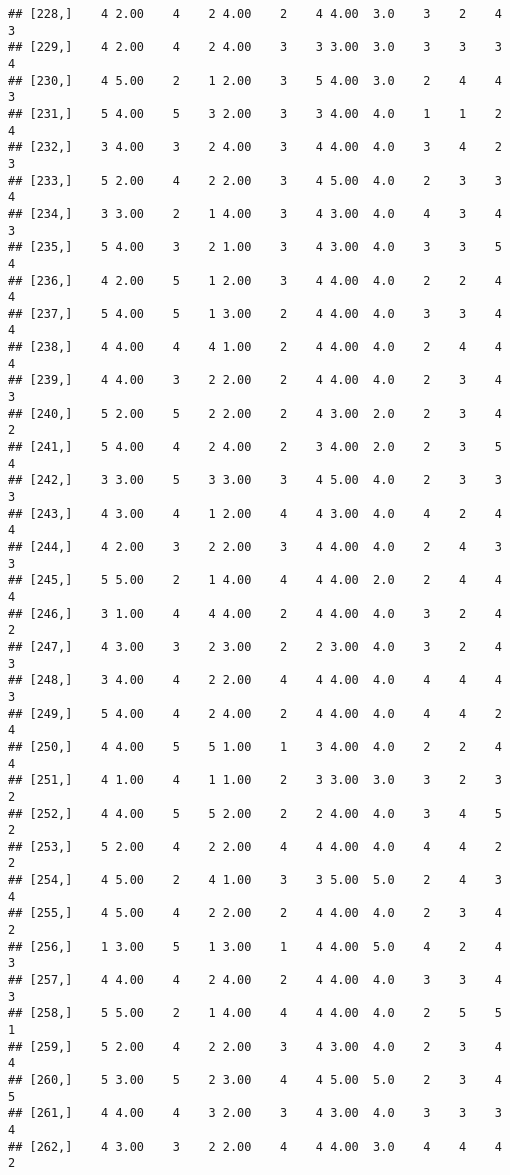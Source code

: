 \documentclass[]{article}
\begin{document}
\begin{verbatim}
## [228,]    4 2.00    4    2 4.00    2    4 4.00  3.0    3    2    4    3
## [229,]    4 2.00    4    2 4.00    3    3 3.00  3.0    3    3    3    4
## [230,]    4 5.00    2    1 2.00    3    5 4.00  3.0    2    4    4    3
## [231,]    5 4.00    5    3 2.00    3    3 4.00  4.0    1    1    2    4
## [232,]    3 4.00    3    2 4.00    3    4 4.00  4.0    3    4    2    3
## [233,]    5 2.00    4    2 2.00    3    4 5.00  4.0    2    3    3    4
## [234,]    3 3.00    2    1 4.00    3    4 3.00  4.0    4    3    4    3
## [235,]    5 4.00    3    2 1.00    3    4 3.00  4.0    3    3    5    4
## [236,]    4 2.00    5    1 2.00    3    4 4.00  4.0    2    2    4    4
## [237,]    5 4.00    5    1 3.00    2    4 4.00  4.0    3    3    4    4
## [238,]    4 4.00    4    4 1.00    2    4 4.00  4.0    2    4    4    4
## [239,]    4 4.00    3    2 2.00    2    4 4.00  4.0    2    3    4    3
## [240,]    5 2.00    5    2 2.00    2    4 3.00  2.0    2    3    4    2
## [241,]    5 4.00    4    2 4.00    2    3 4.00  2.0    2    3    5    4
## [242,]    3 3.00    5    3 3.00    3    4 5.00  4.0    2    3    3    3
## [243,]    4 3.00    4    1 2.00    4    4 3.00  4.0    4    2    4    4
## [244,]    4 2.00    3    2 2.00    3    4 4.00  4.0    2    4    3    3
## [245,]    5 5.00    2    1 4.00    4    4 4.00  2.0    2    4    4    4
## [246,]    3 1.00    4    4 4.00    2    4 4.00  4.0    3    2    4    2
## [247,]    4 3.00    3    2 3.00    2    2 3.00  4.0    3    2    4    3
## [248,]    3 4.00    4    2 2.00    4    4 4.00  4.0    4    4    4    3
## [249,]    5 4.00    4    2 4.00    2    4 4.00  4.0    4    4    2    4
## [250,]    4 4.00    5    5 1.00    1    3 4.00  4.0    2    2    4    4
## [251,]    4 1.00    4    1 1.00    2    3 3.00  3.0    3    2    3    2
## [252,]    4 4.00    5    5 2.00    2    2 4.00  4.0    3    4    5    2
## [253,]    5 2.00    4    2 2.00    4    4 4.00  4.0    4    4    2    2
## [254,]    4 5.00    2    4 1.00    3    3 5.00  5.0    2    4    3    4
## [255,]    4 5.00    4    2 2.00    2    4 4.00  4.0    2    3    4    2
## [256,]    1 3.00    5    1 3.00    1    4 4.00  5.0    4    2    4    3
## [257,]    4 4.00    4    2 4.00    2    4 4.00  4.0    3    3    4    3
## [258,]    5 5.00    2    1 4.00    4    4 4.00  4.0    2    5    5    1
## [259,]    5 2.00    4    2 2.00    3    4 3.00  4.0    2    3    4    4
## [260,]    5 3.00    5    2 3.00    4    4 5.00  5.0    2    3    4    5
## [261,]    4 4.00    4    3 2.00    3    4 3.00  4.0    3    3    3    4
## [262,]    4 3.00    3    2 2.00    4    4 4.00  3.0    4    4    4    2

\end{verbatim}
\end{document}

